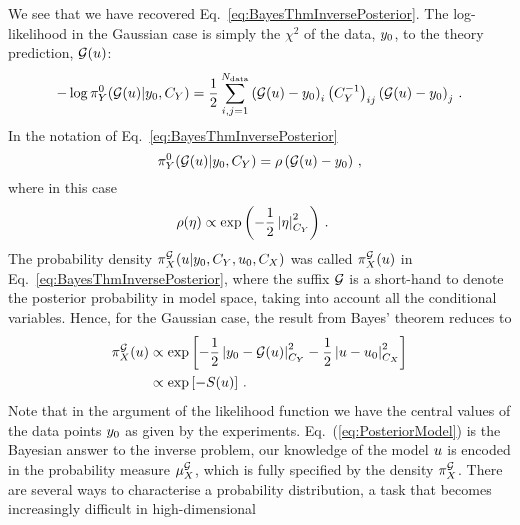 We see that we have recovered Eq.~\ref{eq:BayesThmInversePosterior}. The
log-likelihood in the Gaussian case is simply the $\chi^2$ of the data,
$y_0$, to the theory prediction, $\mathcal{G}(u)$:
\begin{equation}
  \label{eq:LikelyChiSq}
  -\log\pi_{Y}^0(\mathcal{G}(u)|y_0,C_{Y}) =  
    \frac12 \sum_{i,j=1}^{N_{\rm data}}
      \left(\mathcal{G}(u) - y_0 \right)_i
      \left(C_{Y}^{-1}\right)_{ij}
      \left(\mathcal{G}(u) - y_0 \right)_j
    \, .
\end{equation}
In the notation of Eq.~\ref{eq:BayesThmInversePosterior}
\begin{equation}
  \label{eq:IdentifyRho}
  \pi_{Y}^0(\mathcal{G}(u)|y_0,C_{Y}) = \rho\left(
    \mathcal{G}(u) - y_0
  \right)\, ,
\end{equation}
where in this case 
\begin{align}
  \label{eq:RhoGauss}
  \rho(\eta) &\propto \exp\left(
               -\frac12 \left|\eta\right|_{C_{Y}}^2
               \right)\, .
\end{align}
The probability density $\pi^{\mathcal{G}}_{X}(u|y_0,
C_{Y},u_0,C_X)$ was called
$\pi_{X}^{\mathcal{G}}(u)$ in Eq.~\ref{eq:BayesThmInversePosterior}, where
the suffix $\mathcal{G}$ is a short-hand to denote the posterior probability in
model space, taking into account all the conditional variables. Hence, for the
Gaussian case, the result from Bayes' theorem reduces to
\begin{align}
  \label{eq:PosteriorModel}
  \pi_{X}^{\mathcal{G}}(u) 
  &\propto 
  \exp\left[
    -\frac12 \left| y_0 - \mathcal{G}(u) \right|_{C_{Y}} ^2
    -\frac12 \left| u - u_0 \right|_{C_X}^2
  \right] \\ 
  &\propto
  \exp\left[
    - S(u)
  \right]\, .
\end{align}
Note that in the argument of the likelihood function we have the central values
of the data points $y_0$ as given by the experiments.
Eq.~(\ref{eq:PosteriorModel}) is the Bayesian answer to the inverse problem, our
knowledge of the model $u$ is encoded in the probability measure
$\mu_{X}^{\mathcal{G}}$, which is fully specified by the density
$\pi_{X}^{\mathcal{G}}$. There are several ways to characterise a probability
distribution, a task that becomes increasingly difficult in high-dimensional

